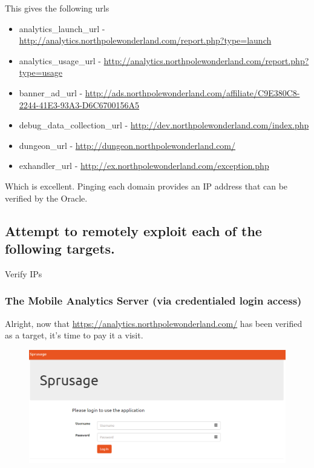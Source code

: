 \documentclass[writeup.tex]{subfiles}
\begin{document}
	This gives the following urls
	\begin{itemize}
		\item analytics\_launch\_url - \url{http://analytics.northpolewonderland.com/report.php?type=launch}
		\item analytics\_usage\_url - \url{http://analytics.northpolewonderland.com/report.php?type=usage}
		\item banner\_ad\_url - \url{http://ads.northpolewonderland.com/affiliate/C9E380C8-2244-41E3-93A3-D6C6700156A5}
		\item debug\_data\_collection\_url - \url{http://dev.northpolewonderland.com/index.php}
		\item dungeon\_url - \url{http://dungeon.northpolewonderland.com/}
		\item exhandler\_url - \url{http://ex.northpolewonderland.com/exception.php}
	\end{itemize}
	
	Which is excellent. Pinging each domain provides an IP address that can be verified by the Oracle.	
	
	\subsection{Attempt to remotely exploit each of the following targets.}
		Verify IPs
		
		\subsubsection{The Mobile Analytics Server (via credentialed login access)}
			Alright, now that \url{https://analytics.northpolewonderland.com/} has been verified as a target, it's time to pay it a visit.
			
			\begin{figure}[H]
				\centering
				\includegraphics[width=\linewidth]{"screenshots/pwns/Site 1 - First"}
			\end{figure}
			
\end{document}
